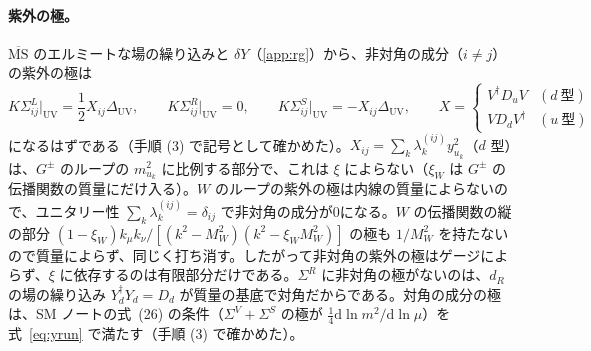 \documentclass[a4paper,10pt]{ltjsarticle}
\newcommand{\dd}{\mathrm{d}}
\newcommand{\MSbar}{\overline{\mathrm{MS}}}
\newcommand{\DUV}{\Delta_{\mathrm{UV}}}
\begin{document}
\paragraph{紫外の極。}$\MSbar$ のエルミートな場の繰り込みと $\delta Y$（\ref{app:rg}）から、非対角の成分（$i\ne j$）の紫外の極は
\begin{equation}
K\Sigma^L_{ij}\big|_{\mathrm{UV}}=\frac12X_{ij}\DUV,\qquad K\Sigma^R_{ij}\big|_{\mathrm{UV}}=0,\qquad K\Sigma^S_{ij}\big|_{\mathrm{UV}}=-X_{ij}\DUV,\qquad
X=\begin{cases}V^\dagger D_uV&(d\ \text{型})\\ VD_dV^\dagger&(u\ \text{型})\end{cases}
\label{eq:uvoff}
\end{equation}
になるはずである（手順 (3) で記号として確かめた）。$X_{ij}=\sum_k\lambda^{(ij)}_ky_{u_k}^2$（$d$ 型）は、$G^\pm$ のループの $m_{u_k}^2$ に比例する部分で、これは $\xi$ によらない（$\xi_W$ は $G^\pm$ の伝播関数の質量にだけ入る）。$W$ のループの紫外の極は内線の質量によらないので、ユニタリー性 $\sum_k\lambda^{(ij)}_k=\delta_{ij}$ で非対角の成分が0になる。$W$ の伝播関数の縦の部分 $(1-\xi_W)k_\mu k_\nu/[(k^2-M_W^2)(k^2-\xi_WM_W^2)]$ の極も $1/M_W^2$ を持たないので質量によらず、同じく打ち消す。したがって非対角の紫外の極はゲージによらず、$\xi$ に依存するのは有限部分だけである。$\Sigma^R$ に非対角の極がないのは、$d_R$ の場の繰り込み $Y_d^\dagger Y_d=D_d$ が質量の基底で対角だからである。対角の成分の極は、SM ノートの式~(26) の条件（$\Sigma^V+\Sigma^S$ の極が $\frac14\dd\ln m^2/\dd\ln\mu$）を式~\eqref{eq:yrun} で満たす（手順 (3) で確かめた）。
\end{document}
